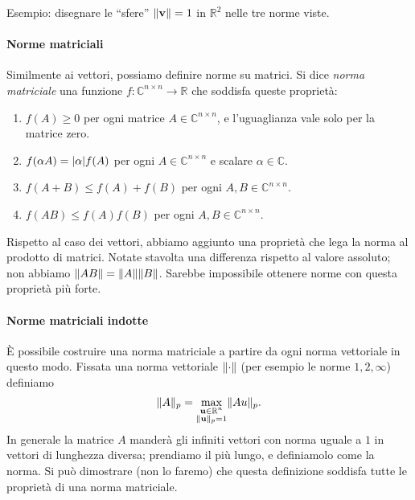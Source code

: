 \documentclass[a4paper]{report}
\DeclarePairedDelimiter{\abs}{\lvert}{\rvert}
\DeclarePairedDelimiter{\norm}{\lVert}{\rVert}
\theoremstyle{definiton}
\theoremstyle{remark}
\begin{document}
Esempio: disegnare le ``sfere'' $\norm{\mathbf{v}}=1$ in $\mathbb{R}^2$ nelle tre norme viste.

\paragraph{Norme matriciali}

Similmente ai vettori, possiamo definire norme su matrici. Si dice \emph{norma matriciale} una funzione $f: \mathbb{C}^{n\times n} \to \mathbb{R}$ che soddisfa queste proprietà:
\begin{enumerate}
    \item $f(A) \geq 0$ per ogni matrice $A\in\mathbb{C}^{n\times n}$, e l'uguaglianza vale solo per la matrice zero.
    \item $f(\alpha A) = \abs{\alpha} f(A)$ per ogni $A\in\mathbb{C}^{n\times n}$ e scalare $\alpha \in \mathbb{C}$.
    \item $f(A+B) \leq f(A) + f(B)$ per ogni $A,B\in\mathbb{C}^{n\times n}$.
    \item $f(AB) \leq f(A)f(B)$ per ogni $A,B\in\mathbb{C}^{n\times n}$.
\end{enumerate}
Rispetto al caso dei vettori, abbiamo aggiunto una proprietà che lega la norma al prodotto di matrici. Notate stavolta una differenza rispetto al valore assoluto; non abbiamo $\norm{AB} = \norm{A}\norm{B}$. Sarebbe impossibile ottenere norme con questa proprietà più forte.

\paragraph{Norme matriciali indotte}

È possibile costruire una norma matriciale a partire da ogni norma vettoriale in questo modo. Fissata una norma vettoriale $\norm{\cdot}$ (per esempio le norme $1,2,\infty$) definiamo
\begin{equation} \label{normamatriciale}
    \norm{A}_p = \max_{\substack{\mathbf{u}\in\mathbb{R}^n \\ \norm{\mathbf{u}}_p=1}} \norm{Au}_p.
\end{equation}
In generale la matrice $A$ manderà gli infiniti vettori con norma uguale a $1$ in vettori di lunghezza diversa; prendiamo il più lungo, e definiamolo come la norma. Si può dimostrare (non lo faremo) che questa definizione soddisfa tutte le proprietà di una norma matriciale.
\end{document}
